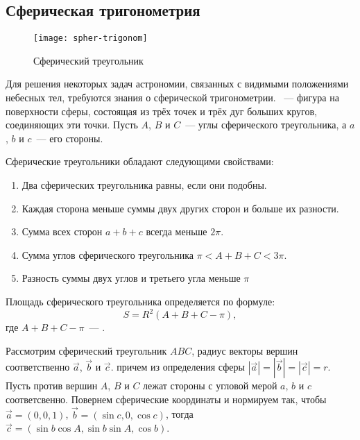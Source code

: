 \subsection{Сферическая тригонометрия}
\label{sec:spher-trig}
\begin{wrapfigure}[10]{r}{.3\tw}
	\centering
	\vspace{-1pc}
	\texttt{[image: spher-trigonom]}
	\caption{Сферический треугольник}
\end{wrapfigure}
Для решения некоторых задач астрономии, связанных с видимыми положениями небесных тел, требуются знания о сферической тригонометрии. ~--- фигура на поверхности сферы, состоящая из трёх точек и трёх дуг больших кругов, соединяющих эти точки. Пусть $A$, $B$ и $C$~--- углы сферического треугольника, а $a$, $b$ и $c$~--- его стороны.

Сферические треугольники обладают следующими свойствами:
\begin{enumerate}
	\item Два сферических треугольника равны, если они подобны.
	\item Каждая сторона меньше суммы двух других сторон и больше их разности.
	\item Сумма всех сторон $a+b+c$ всегда меньше $2\pi$.
	\item Сумма углов сферического треугольника $\pi < A + B + C < 3\pi$.
	\item Разность суммы двух углов и третьего угла меньше $\pi$
\end{enumerate}

Площадь сферического треугольника определяется по формуле:
\begin{equation}
	S = R^2( A + B + C - \pi),
\end{equation}
где $A + B + C - \pi$~--- .

Рассмотрим сферический треугольник $ABC$, радиус векторы вершин соответственно $\vec{a}$, $\vec{b}$ и $\vec{c}$. причем из определения сферы $|\vec{a}| = |\vec{b}| = |\vec{c}| = r$. Пусть против вершин $A$, $B$ и $C$ лежат стороны с угловой мерой $a$, $b$ и $c$ соответсвенно. Повернем сферические координаты и нормируем так, чтобы $\vec{a} = (0, 0, 1)$, $\vec{b} = (\sin c, 0, \cos c)$, тогда $ \vec{c} = (\sin b \cos A, \sin b \sin A, \cos b)$.


